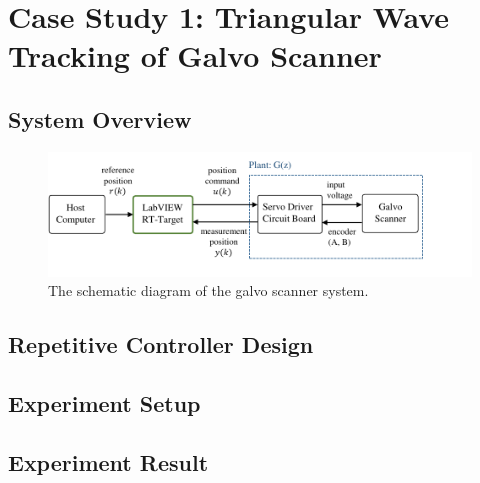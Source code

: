 \documentclass[a4paper, 12pt, twoside, openright]{mythesis}
\begin{document}
\chapter{Case Study 1: Triangular Wave Tracking of Galvo Scanner}
\label{ch: Case Study 1: Triangular Wave Tracking of Galvo Scanner}


\section{System Overview} 
 \label{sec: System Overview}


\begin{figure}
 	\begin{center}
   	\includegraphics[width=1.3\linewidth] {image/Galvo_Scanner_SysOverview}
 	\caption{The schematic diagram of the galvo scanner system.}
 	\label{fig:Galvo_SysOverview}
 	\end{center}
\end{figure}



\section{Repetitive Controller Design} 
 \label{sec: Repetitive Controller Design}
 
 
\section{Experiment Setup} 
 \label{sec: Experiment Setup}
 
 
\section{Experiment Result} 
 \label{sec: Experiment Result}




\end{document}
